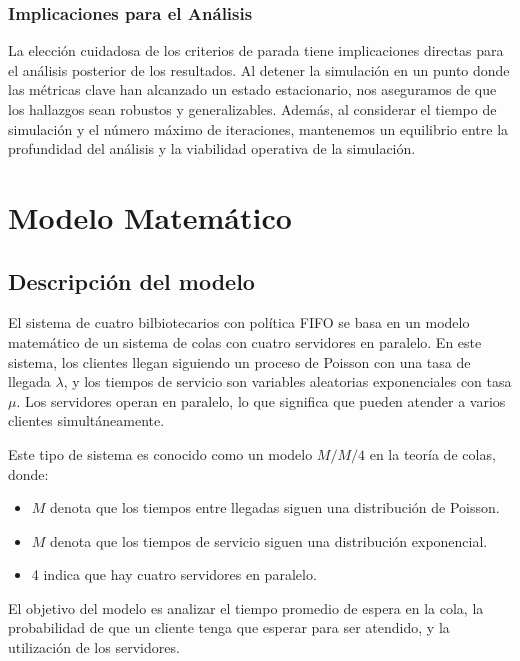 \documentclass[10pt,twocolumn]{article}
\begin{document}
{\subsubsection{Implicaciones para el Análisis}
La elección cuidadosa de los criterios de parada tiene implicaciones directas para el análisis posterior de los resultados. Al detener la simulación en un punto donde las métricas clave han alcanzado un estado estacionario, nos aseguramos de que los hallazgos sean robustos y generalizables. Además, al considerar el tiempo de simulación y el número máximo de iteraciones, mantenemos un equilibrio entre la profundidad del análisis y la viabilidad operativa de la simulación.
}



\section{Modelo Matemático}

\subsection{Descripción del modelo}

El sistema de cuatro bilbiotecarios con política FIFO se basa en un modelo matemático de un sistema de colas con cuatro servidores en paralelo. En este sistema, los clientes llegan siguiendo un proceso de Poisson con una tasa de llegada $\lambda$, y los tiempos de servicio son variables aleatorias exponenciales con tasa $\mu$. Los servidores operan en paralelo, lo que significa que pueden atender a varios clientes simultáneamente.

Este tipo de sistema es conocido como un modelo $M/M/4$ en la teoría de colas, donde:

\begin{itemize}
	\item $M$ denota que los tiempos entre llegadas siguen una distribución de Poisson.
	\item $M$ denota que los tiempos de servicio siguen una distribución exponencial.
	\item 4 indica que hay cuatro servidores en paralelo.
\end{itemize}

El objetivo del modelo es analizar el tiempo promedio de espera en la cola, la probabilidad de que un cliente tenga que esperar para ser atendido, y la utilización de los servidores.
\end{document}
